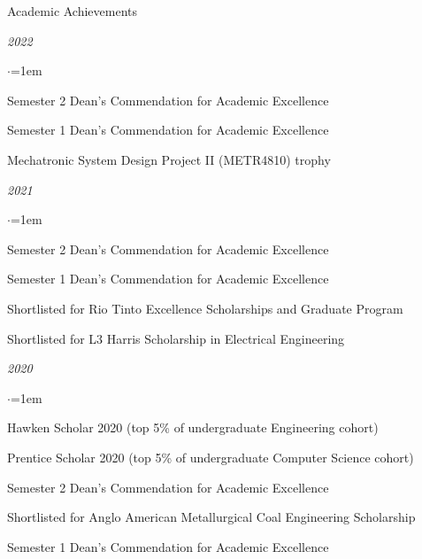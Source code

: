 \documentclass{resume} %
\begin{document}



\newpage

\begin{rSection}{Academic Achievements} \itemsep -2pt
\item \textit{2022}
\begin{list}{$\cdot$}{\leftmargin=1em} %
    \item Semester 2 Dean's Commendation for Academic Excellence
    \item Semester 1 Dean's Commendation for Academic Excellence
    \item Mechatronic System Design Project II (METR4810) trophy
\end{list}

\vspace{1em}

\item \textit{2021}
\begin{list}{$\cdot$}{\leftmargin=1em} %
    \item Semester 2 Dean's Commendation for Academic Excellence
    \item Semester 1 Dean's Commendation for Academic Excellence
    \item Shortlisted for Rio Tinto Excellence Scholarships and Graduate Program
    \item Shortlisted for L3 Harris Scholarship in Electrical Engineering
\end{list}

\vspace{1em}

\item \textit{2020}
\begin{list}{$\cdot$}{\leftmargin=1em} %
    \item Hawken Scholar 2020 (top 5\% of undergraduate Engineering cohort)
    \item Prentice Scholar 2020 (top 5\% of undergraduate Computer Science cohort)
    \item Semester 2 Dean's Commendation for Academic Excellence
    \item Shortlisted for Anglo American Metallurgical Coal Engineering Scholarship
    \item Semester 1 Dean's Commendation for Academic Excellence
\end{list}


\end{rSection}
\end{document}
